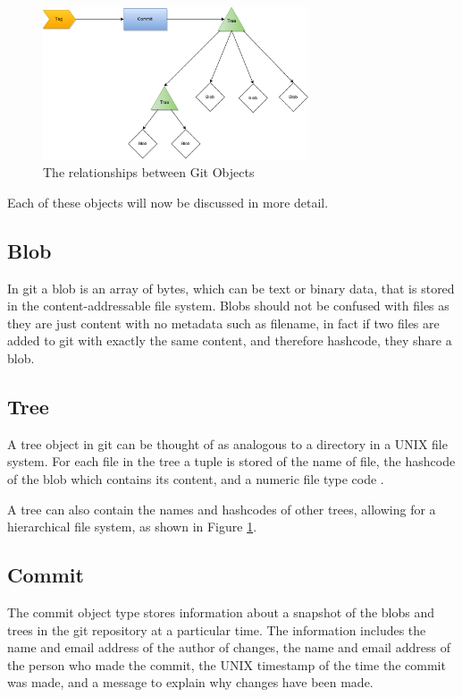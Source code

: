 \documentclass[11pt]{book}
\begin{document}
\begin{figure}[h]
	\centering
	\includegraphics[width=0.7\textwidth]{images/gitobjectmodel}
	\caption{The relationships between Git Objects}
	\label{fig:gitobjectmodeldiagram}
\end{figure} 

Each of these objects will now be discussed in more detail.

\subsection{Blob}
In git a blob is an array of bytes, which can be text or binary data, that is stored in the content-addressable file system. Blobs should not be confused with files as they are just content with no metadata such as filename, in fact if two files are added to git with exactly the same content, and therefore hashcode, they share a blob.

\subsection{Tree}
A tree object in git can be thought of as analogous to a directory in a UNIX file system. For each file in the tree a tuple is stored of the name of file, the hashcode of the blob which contains its content, and a numeric file type code \cite{gitmagic}.

A tree can also contain the names and hashcodes of other trees, allowing for a hierarchical file system, as shown in Figure \ref{fig:gitobjectmodeldiagram}. 

\subsection{Commit}
The commit object type stores information about a snapshot of the blobs and trees in the git repository at a particular time. The information includes the name and email address of the author of changes, the name and email address of the person who made the commit, the UNIX timestamp of the time the commit was made, and a message to explain why changes have been made.
\end{document}
